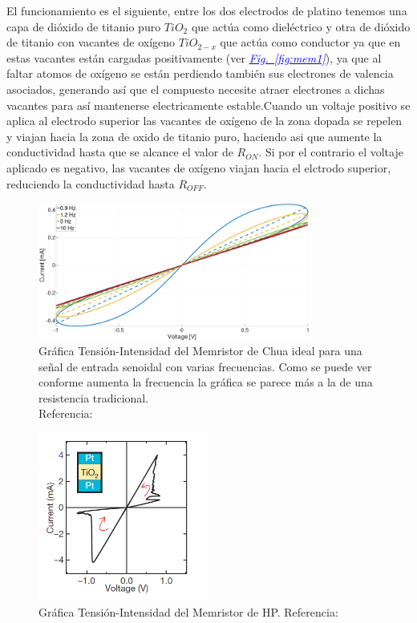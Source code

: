 \documentclass[12pt,a4paper]{report} %
\newcommand{\fref}[1]{\hyperref[#1]{\textcolor{blue}{\textit{Fig.~\ref*{#1}}}}}
\begin{document}
	El funcionamiento es el siguiente, entre los dos electrodos de platino tenemos una capa de dióxido de titanio puro $TiO_2$ que actúa como dieléctrico y otra de dióxido de titanio con vacantes de oxígeno $TiO_{2-x}$ que actúa como conductor ya que en estas vacantes están cargadas positivamente (ver \fref{fig:mem1}), ya que al faltar atomos de oxígeno se están perdiendo también sus electrones de valencia asociados, generando así que el compuesto necesite atraer electrones a dichas vacantes para así mantenerse electricamente estable.Cuando un voltaje positivo se aplica al electrodo superior las vacantes de oxígeno de la zona dopada se repelen y viajan hacia la zona de oxido de titanio puro, haciendo asi que aumente la conductividad hasta que se alcance el valor de $R_{ON}$. Si por el contrario el voltaje aplicado es negativo, las vacantes de oxígeno viajan hacia el elctrodo superior, reduciendo la conductividad hasta $R_{OFF}$.
	
	\begin{figure}[h]
		\centering
		\includegraphics[width=0.8\textwidth]{iv_chua.png}
		\caption{Gráfica Tensión-Intensidad del Memristor de Chua ideal para una señal de entrada senoidal con varias frecuencias. Como se puede ver conforme aumenta la frecuencia la gráfica se parece más a la de una resistencia tradicional. \\ Referencia: \cite{outsiders}}
		\label{fig:iv_chua}
	\end{figure}\smallskip
	
		\begin{figure}[h]
		\centering
		\includegraphics[width=0.5\textwidth]{iv_hp.png}
		\caption{Gráfica Tensión-Intensidad del Memristor de HP. Referencia: \cite{HP}}
		\label{fig:iv_hp}
	\end{figure}\smallskip
	
\end{document}
